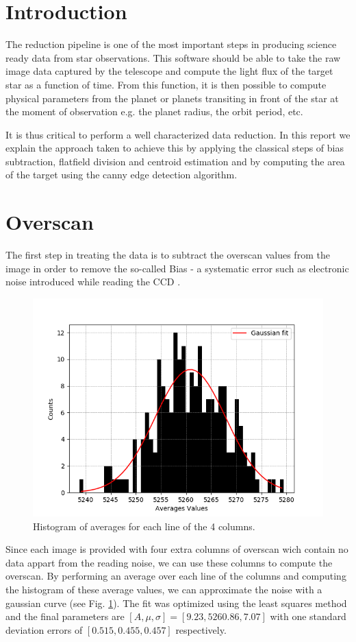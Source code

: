 \documentclass{aa}
\begin{document}
\section{Introduction}

The reduction pipeline is one of the most important steps in producing science ready data from star observations. This software should be able to take the raw image data captured by the telescope and compute the light flux of the target star as a function of time. From this function, it is then possible to compute physical parameters from the planet or planets transiting in front of the star at the moment of observation e.g. the planet radius, the orbit period, etc.

It is thus critical to perform a well characterized data reduction. In this report we explain the approach taken to achieve this by applying the classical steps of bias subtraction, flatfield division and centroid estimation and by computing the area of the target using the canny edge detection algorithm.

\section{Overscan}

The first step in treating the data is to subtract the overscan values from the image in order to remove the so-called Bias - a systematic error such as electronic noise introduced while reading the CCD .

\begin{figure}
\centering
\includegraphics[width=.4\textwidth]{overscan_hist.png}
\caption{Histogram of averages for each line of the 4 columns.}
\label{fig:overscan_hist}
\end{figure}

Since each image is provided with four extra columns of overscan wich contain no data appart from the reading noise, we can use these columns to compute the overscan. By performing an average over each line of the columns and computing the histogram of these average values, we can approximate the noise with a gaussian curve (see Fig. \ref{fig:overscan_hist}). The fit was optimized using the least squares method and the final parameters are $[A, \mu , \sigma] = [9.23, 5260.86, 7.07]$ with one standard deviation errors of $[0.515, 0.455, 0.457]$ respectively.
\end{document}
